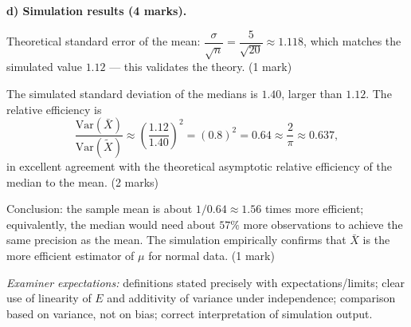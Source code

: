 \documentclass[11pt]{article}
\begin{document}
\begin{corrige}
\textbf{d) Simulation results (4 marks).}

Theoretical standard error of the mean: $\dfrac{\sigma}{\sqrt{n}} = \dfrac{5}{\sqrt{20}} \approx 1.118$, which matches the simulated value $1.12$ — this validates the theory. \hfill (1 mark)

The simulated standard deviation of the medians is $1.40$, larger than $1.12$. The relative efficiency is
\[ \frac{\mathrm{Var}(\bar{X})}{\mathrm{Var}(\tilde{X})} \approx \left(\frac{1.12}{1.40}\right)^2 = (0.8)^2 = 0.64 \approx \frac{2}{\pi} \approx 0.637, \]
in excellent agreement with the theoretical asymptotic relative efficiency of the median to the mean. \hfill (2 marks)

Conclusion: the sample mean is about $1/0.64 \approx 1.56$ times more efficient; equivalently, the median would need about $57\%$ more observations to achieve the same precision as the mean. The simulation empirically confirms that $\bar{X}$ is the more efficient estimator of $\mu$ for normal data. \hfill (1 mark)

\emph{Examiner expectations:} definitions stated precisely with expectations/limits; clear use of linearity of $E$ and additivity of variance under independence; comparison based on variance, not on bias; correct interpretation of simulation output.
\end{corrige}
\end{document}
